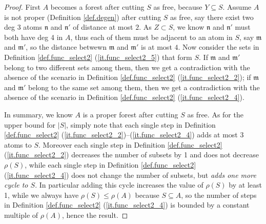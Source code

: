\documentclass[10pt, reqno]{amsart}
\newcommand{\mf}{\mathfrak m}
\newcommand{\nf}{\mathfrak n}
\theoremstyle{definition}
\theoremstyle{remark}
\numberwithin{equation}{section}
\begin{document}
\begin{proof} First $A$ becomes a forest after cutting $S$ as free, because $Y\subseteq S$. Assume $A$ is not proper (Definition \ref{def.degen}) after cutting $S$ as free, say there exist two deg 3 atoms $\nf$ and $\nf'$ of distance at most $2$. As $Z\subset S$, we know $\nf$ and $\nf'$ must both have deg 4 in $A$, thus each of them must be adjacent to an atom in $S$, say $\mf$ and $\mf'$, so the distance betwewn $\mf$ and $\mf'$ is at most $4$. Now consider the sets in Definition \ref{def.func_select2} (\ref{it.func_select2_5}) that form $S$. If $\mf$ and $\mf'$ belong to two different sets among them, then we get a contradiction with the absence of the scenario in Definition \ref{def.func_select2} (\ref{it.func_select2_2}); if $\mf$ and $\mf'$ belong to the same set among them, then we get a contradiction with the absence of the scenario in Definition \ref{def.func_select2} (\ref{it.func_select2_4}).

In summary, we know $A$ is a proper forest after cutting $S$ as free. As for the upper bound for $|S|$, simply note that each single step in Definition \ref{def.func_select2} (\ref{it.func_select2_2})--(\ref{it.func_select2_4}) adds at most $3$ atoms to $S$. Moreover each single step in Definition \ref{def.func_select2} (\ref{it.func_select2_2}) decreases the number of subsets by 1 and does not decrease $\rho(S)$, while each single step in Definition \ref{def.func_select2} (\ref{it.func_select2_4}) does not change the number of subsets, but \emph{adds one more cycle to $S$}. In particular adding this cycle increases the value of $\rho(S)$ by at least 1, while we always have $\rho(S)\leq \rho(A)$ because $S\subseteq A$, so the number of steps in Definition \ref{def.func_select2} (\ref{it.func_select2_4}) is bounded by a constant multiple of $\rho(A)$, hence the result.
\end{proof}
\end{document}
